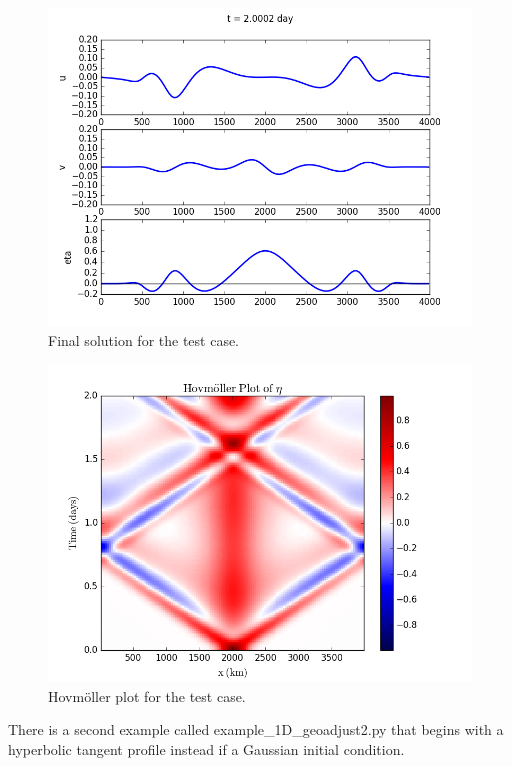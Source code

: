 \documentclass[letterpaper,10pt,english]{sphinxmanual}
\begin{document}
\begin{figure}[htbp]
\centering
\capstart

\includegraphics{ex1_fig1.png}
\caption{Final solution for the test case.}\end{figure}
\begin{figure}[htbp]
\centering
\capstart

\includegraphics{ex1_fig2.png}
\caption{Hovmöller plot for the test case.}\end{figure}

There is a second example called example\_1D\_geoadjust2.py that begins
with a hyperbolic tangent profile instead if a Gaussian initial
condition.
\end{document}
